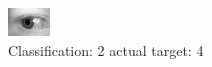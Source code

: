 \begin{figure}[h!]
\begin{center}
\includegraphics[width=0.60\columnwidth]{figures/ID741_class_2_target_4.png}
\end{center}
\caption{ Classification: 2 actual target: 4}
\label{fig:ID741_class_2_target_4}
\end{figure}
